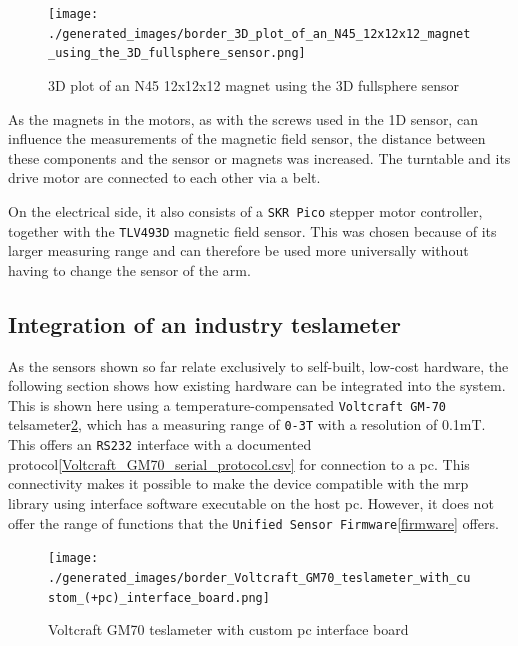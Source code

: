 \begin{figure}
\centering
\texttt{[image: ./generated\_images/border\_3D\_plot\_of\_an\_N45\_12x12x12\_magnet\_using\_the\_3D\_fullsphere\_sensor.png]}
\caption{3D plot of an N45 12x12x12 magnet using the 3D fullsphere
sensor
\label{3D_plot_of_an_N45_12x12x12_magnet_using_the_3D_fullsphere_sensor.png}}
\end{figure}

As the magnets in the motors, as with the screws used in the 1D sensor,
can influence the measurements of the magnetic field sensor, the
distance between these components and the sensor or magnets was
increased. The turntable and its drive motor are connected to each other
via a belt.

On the electrical side, it also consists of a
\passthrough{\lstinline!SKR Pico!} stepper motor controller, together
with the \passthrough{\lstinline!TLV493D!} magnetic field sensor. This
was chosen because of its larger measuring range and can therefore be
used more universally without having to change the sensor of the arm.

\hypertarget{integration-of-an-industry-teslameter}{%
\subsection{Integration of an industry
teslameter}\label{integration-of-an-industry-teslameter}}

As the sensors shown so far relate exclusively to self-built, low-cost
hardware, the following section shows how existing hardware can be
integrated into the system. This is shown here using a
temperature-compensated \passthrough{\lstinline!Voltcraft GM-70!}
telsameter\ref{Voltcraft_GM70_teslameter_with_custom_(+pc)_interface_board.png},
which has a measuring range of \passthrough{\lstinline!0-3T!} with a
resolution of 0.1mT. This offers an \passthrough{\lstinline!RS232!}
interface with a documented
protocol\ref{Voltcraft_GM70_serial_protocol.csv} for connection to a
\gls{pc}. This connectivity makes it possible to make the device
compatible with the \gls{mrp} library using interface software
\cite{VoltcraftGM70Rest} executable on the host \gls{pc}. However,
it does not offer the range of functions that the
\passthrough{\lstinline!Unified Sensor Firmware!}\ref{firmware} offers.

\begin{figure}
\centering
\texttt{[image: ./generated\_images/border\_Voltcraft\_GM70\_teslameter\_with\_custom\_(+pc)\_interface\_board.png]}
\caption{Voltcraft GM70 teslameter with custom \gls{pc} interface board
\label{Voltcraft_GM70_teslameter_with_custom_(+pc)_interface_board.png}}
\end{figure}

